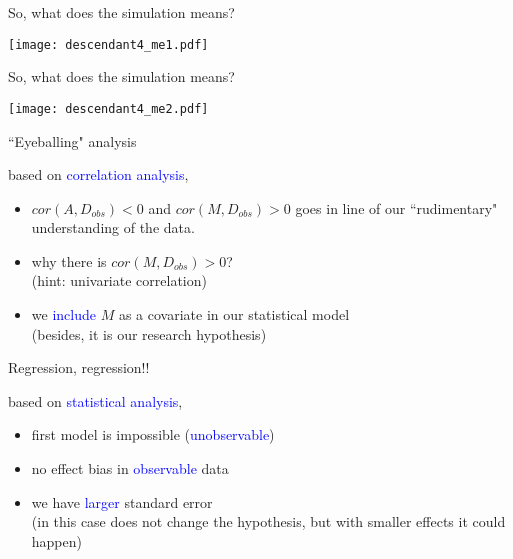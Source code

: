 %
%
\begin{frame}
	{So, what does the simulation means?}
	
	\begin{figure*}
		\texttt{[image: descendant4\_me1.pdf]}
	\end{figure*}
\end{frame}
%
%
\begin{frame}
	{So, what does the simulation means?}
	
	\begin{figure*}
		\texttt{[image: descendant4\_me2.pdf]}
	\end{figure*}
\end{frame}
%
%
\begin{lhframe}[rhgraphic={\texttt{[image: descendant4\_panel.pdf]}}]
	{``Eyeballing" analysis}
	
	based on \textcolor{blue}{correlation analysis},
	\begin{itemize}
		\item $cor(A, D_{obs})<0$ and $cor(M, D_{obs})>0$
		goes in line of our ``rudimentary" understanding of the data.
		\item why there is $cor(M, D_{obs})>0$? \\
		{\small (hint: univariate correlation)}
		\item we \textcolor{blue}{include} $M$ as a covariate in our statistical model \\
		{\small (besides, it is our research hypothesis)}
	\end{itemize}
\end{lhframe}
%
%
\begin{lhframe}[rhgraphic={\texttt{[image: descendant4\_reg.png]}}]
	{Regression, regression!!}
	
	based on \textcolor{blue}{statistical analysis},
	\begin{itemize}
		\item first model is impossible (\textcolor{blue}{unobservable})
		\item no effect bias in \textcolor{blue}{observable} data
		\item we have \textcolor{blue}{larger} standard error \\
		{\small (in this case does not change the hypothesis, but with smaller effects it could happen)}
	\end{itemize}
\end{lhframe}
%
%

